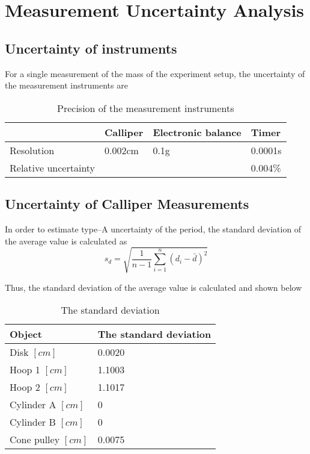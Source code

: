 \section{Measurement Uncertainty Analysis}


\subsection{Uncertainty of instruments}
For a single measurement of the mass of the experiment setup, the uncertainty of the measurement instruments are

\begin{table}[H]
  \centering
  \begin{tabularx}{\textwidth}{|X|X|X|X|}
    \hline
     & Calliper & Electronic balance & Timer\\
	 \hline
	 Resolution & 0.002cm & 0.1g & 0.0001s \\
	 \hline
	 Relative uncertainty & & & 0.004\% \\
	\hline
  \end{tabularx}
  \caption{Precision of the measurement instruments}
  \end{table}

\subsection{Uncertainty of Calliper Measurements}

In order to estimate type–A uncertainty of the period, the standard deviation of the average value is calculated as
$$  s_d = \sqrt{\frac{1}{n-1}\sum_{i=1}^{n}(d_i - \bar{d})^2 }  $$

Thus, the standard deviation of the average value is calculated and shown below

\begin{table}[H]
  \centering
  \begin{tabularx}{\textwidth}{|p{6cm}|X|}
    \hline
    Object & The standard deviation\\
    \hline
    Disk $[cm]$& 0.0020 \\
    Hoop 1 $[cm]$& 1.1003 \\
    Hoop 2 $[cm]$& 1.1017 \\
    Cylinder A $[cm]$& 0 \\
    Cylinder B $[cm]$& 0 \\
    Cone pulley $[cm]$& 0.0075 \\
    \hline
  \end{tabularx}
  \caption{The standard deviation}
  \end{table}


